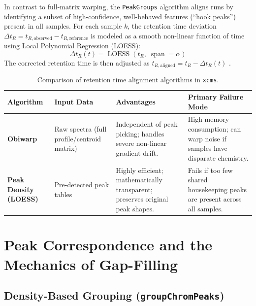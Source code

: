 \documentclass[11pt,twoside,openright]{book}
\begin{document}
In contrast to full-matrix warping, the \texttt{PeakGroups} algorithm aligns runs by identifying a subset of high-confidence, well-behaved features (``hook peaks'') present in all samples. For each sample $k$, the retention time deviation $\Delta t_R = t_{R, \text{observed}} - t_{R, \text{reference}}$ is modeled as a smooth non-linear function of time using Local Polynomial Regression (LOESS):
\begin{equation}
\label{eq:loess_alignment}
\Delta t_R(t) = \operatorname{LOESS}(t_R, \; \operatorname{span} = \alpha)
\end{equation}
The corrected retention time is then adjusted as $t_{R, \text{aligned}} = t_R - \Delta t_R(t)$ \cite{smith2006xcms}.

\begin{table}[htbp]
\centering
\small
\caption{Comparison of retention time alignment algorithms in \texttt{xcms}.}
\label{tab:alignment_comparison}
\begin{tabularx}{\textwidth}{l p{3.2cm} p{4.0cm} X}
\toprule
\textbf{Algorithm} & \textbf{Input Data} & \textbf{Advantages} & \textbf{Primary Failure Mode} \\
\midrule
\textbf{Obiwarp} & Raw spectra (full profile/centroid matrix) & Independent of peak picking; handles severe non-linear gradient drift. & High memory consumption; can warp noise if samples have disparate chemistry. \\
\addlinespace
\textbf{Peak Density (LOESS)} & Pre-detected peak tables & Highly efficient; mathematically transparent; preserves original peak shapes. & Fails if too few shared housekeeping peaks are present across all samples. \\
\bottomrule
\end{tabularx}
\end{table}

\section{Peak Correspondence and the Mechanics of Gap-Filling}

\subsection{Density-Based Grouping (\texttt{groupChromPeaks})}
\end{document}
